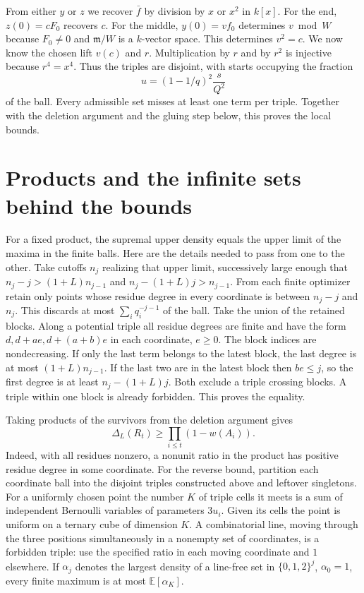 \documentclass[11pt]{article}
\newcommand{\m}{\mathfrak m}
\begin{document}
From either $y$ or $z$ we recover $\bar f$ by division by $x$ or $x^2$ in $k[x]$. For the end, $z(0)=cF_0$ recovers $c$. For the middle, $y(0)=v f_0$ determines $v\bmod W$ because $F_0\ne0$ and $\m/W$ is a $k$-vector space. This determines $v^2=c$. We now know the chosen lift $v(c)$ and $r$. Multiplication by $r$ and by $r^2$ is injective because $r^4=x^4$. Thus the triples are disjoint, with starts occupying the fraction
\[
                    u=(1-1/q)^2\frac{s}{Q^2}
\]
of the ball. Every admissible set misses at least one term per triple. Together with the deletion argument and the gluing step below, this proves the local bounds.

\section{Products and the infinite sets behind the bounds}
For a fixed product, the supremal upper density equals the upper limit of the maxima in the finite balls. Here are the details needed to pass from one to the other. Take cutoffs $n_j$ realizing that upper limit, successively large enough that $n_j-j>(1+L)n_{j-1}$ and $n_j-(1+L)j>n_{j-1}$. From each finite optimizer retain only points whose residue degree in every coordinate is between $n_j-j$ and $n_j$. This discards at most $\sum_i q_i^{-j-1}$ of the ball. Take the union of the retained blocks. Along a potential triple all residue degrees are finite and have the form $d,d+ae,d+(a+b)e$ in each coordinate, $e\ge0$. The block indices are nondecreasing. If only the last term belongs to the latest block, the last degree is at most $(1+L)n_{j-1}$. If the last two are in the latest block then $be\le j$, so the first degree is at least $n_j-(1+L)j$. Both exclude a triple crossing blocks. A triple within one block is already forbidden. This proves the equality.

Taking products of the survivors from the deletion argument gives
\[
                  \Delta_L(R_t)\ge\prod_{i\le t}(1-w(A_i)).
\]
Indeed, with all residues nonzero, a nonunit ratio in the product has positive residue degree in some coordinate. For the reverse bound, partition each coordinate ball into the disjoint triples constructed above and leftover singletons. For a uniformly chosen point the number $K$ of triple cells it meets is a sum of independent Bernoulli variables of parameters $3u_i$. Given its cells the point is uniform on a ternary cube of dimension $K$. A combinatorial line, moving through the three positions simultaneously in a nonempty set of coordinates, is a forbidden triple: use the specified ratio in each moving coordinate and $1$ elsewhere. If $\alpha_j$ denotes the largest density of a line-free set in $\{0,1,2\}^j$, $\alpha_0=1$, every finite maximum is at most $\mathbb E[\alpha_K]$.
\end{document}
